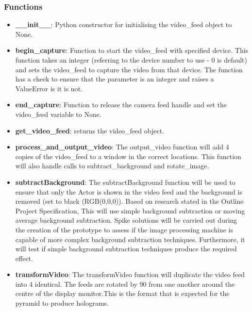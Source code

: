 \documentclass{article}
\begin{document}
\subsubsection{Functions}

\begin{itemize}
	\item \textbf{\_\_init\_\_}: Python constructor for initialising the video\_feed object to None.
	
	\item \textbf{begin\_capture}: Function to start the video\_feed with specified device. This function takes an integer (referring to the device number to use - 0 is default) and sets the video\_feed to capture the video from that device. The function has a check to ensure that the parameter is an integer and raises a ValueError is it is not.
	
	\item \textbf{end\_capture}: Function to release the camera feed handle and set the video\_feed variable to None.
	
	\item \textbf{get\_video\_feed}: returns the video\_feed object.   

	\item \textbf{process\_and\_output\_video}: The output\_video function will add  4 copies of the video\_feed to a window in the correct locations. This function will also handle calls to subtract\_background and rotate\_image.

	\item \textbf{subtractBackground}: The subtractBackground function will be used to ensure that only the Actor is shown in the video feed and the background is removed (set to black (RGB(0,0,0)). Based on research stated in the Outline Project Specification, This will use simple background subtraction or moving average background subtraction. Spike solutions will be carried out during the creation of the prototype to assess if the image processing machine is capable of more complex background subtraction techniques. Furthermore, it will test if simple background subtraction techniques produce the required effect.

	\item \textbf{transformVideo}: The transformVideo function will duplicate the video feed into 4 identical. The feeds are rotated by 90 from one another around the centre of the display monitor.This is the format that is expected for the pyramid to produce holograms.
\end{itemize}
\end{document}
